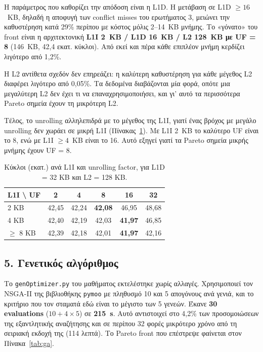 \documentclass[11pt,a4paper]{article}
\begin{document}
Η παράμετρος που καθορίζει την απόδοση είναι η L1D. Η μετάβαση σε L1D $\ge 16$~KB, δηλαδή
η αποφυγή των conflict misses του ερωτήματος 3, μειώνει την καθυστέρηση κατά 29\% περίπου
με κόστος μόλις 2--14~KB μνήμης. Το «γόνατο» του front είναι η αρχιτεκτονική
\textbf{L1I 2~KB / L1D 16~KB / L2 128~KB με UF = 8} (146~KB, 42,4 εκατ. κύκλοι). Από εκεί και
πέρα κάθε επιπλέον μνήμη κερδίζει λιγότερο από 1,2\%.

Η L2 αντίθετα σχεδόν δεν επηρεάζει: η καλύτερη καθυστέρηση για κάθε μέγεθος L2 διαφέρει
λιγότερο από 0,05\%. Τα δεδομένα διαβάζονται μία φορά, οπότε μια μεγαλύτερη L2 δεν έχει τι να
επαναχρησιμοποιήσει, και γι' αυτό τα περισσότερα Pareto σημεία έχουν τη μικρότερη L2.

Τέλος, το unrolling αλληλεπιδρά με το μέγεθος της L1I, γιατί ένας βρόχος με μεγάλο unrolling
δεν χωράει σε μικρή L1I (Πίνακας~\ref{tab:l1iuf}). Με L1I 2~KB το καλύτερο UF είναι το 8, ενώ
με L1I $\ge 4$~KB είναι το 16. Αυτό εξηγεί γιατί τα Pareto σημεία μικρής μνήμης έχουν UF = 8.

\begin{table}[H]
\centering
\caption{Κύκλοι (εκατ.) ανά L1I και unrolling factor, για L1D = 32 KB και L2 = 128 KB.}
\label{tab:l1iuf}
\begin{tabular}{@{}lccccc@{}}
\toprule
L1I \textbackslash{} UF & 2 & 4 & 8 & 16 & 32 \\
\midrule
2 KB      & 42,45 & 42,24 & \textbf{42,08} & 46,95 & 48,68 \\
4 KB      & 42,40 & 42,19 & 42,03 & \textbf{41,97} & 46,85 \\
$\ge$ 8 KB & 42,39 & 42,18 & 42,01 & \textbf{41,97} & 42,16 \\
\bottomrule
\end{tabular}
\end{table}

\subsection*{5. Γενετικός αλγόριθμος}

Το \texttt{genOptimizer.py} του μαθήματος εκτελέστηκε χωρίς αλλαγές. Χρησιμοποιεί τον
NSGA-II της βιβλιοθήκης \texttt{pymoo} με πληθυσμό 10 και 5 απογόνους ανά γενιά, και το
κριτήριο που τον σταματά εδώ είναι το μέγιστο των 5 γενεών. Έκανε \textbf{30 evaluations}
($10 + 4 \times 5$) σε \textbf{215~s}. Αυτό αντιστοιχεί στο 4,2\% των προσομοιώσεων της
εξαντλητικής αναζήτησης και σε περίπου 32 φορές μικρότερο χρόνο από τη σειριακή εκδοχή της
(114 λεπτά). Το Pareto front που επέστρεψε φαίνεται στον Πίνακα~\ref{tab:ga}.
\end{document}
